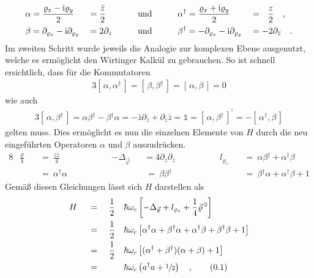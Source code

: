 \documentclass[a4paper,11pt]{article}
\newcommand{\ind}[2]{{_{#1}^{#2}}}
\newcommand{\+}{\dagger}
\newcommand{\com}[2]{[\, #1, #2 \,]}
\newcommand\numberthis{\stepcounter{equation} \tag{\thesection.\theequation}}
\renewcommand{\v}{\vec}
\renewcommand{\^}{\hat}
\renewcommand{\tt}{\text}
\renewcommand{\~}{\widetilde}
\begin{document}
\begin{alignat*}{5}
& \alpha = \frac{\varrho_x-\tt i \varrho_y}{2}&&=\frac{\bar z}{2} && \qquad \tt{und} \qquad && \alpha\ind{}{\+} = \frac{\varrho_x+\tt i \varrho_y}{2}&&=\ \ \frac{ z}{2} \quad, \\
& \beta = \partial_{\varrho_x}-\tt i \partial_{\varrho_y}&&=2\partial_z && \qquad \tt{und} \qquad && \beta\ind{}{\+} = -\partial_{\varrho_x}-\tt i \partial_{\varrho_y}&&=-2\partial_{\bar z} \quad.
\end{alignat*}
Im zweiten Schritt wurde jeweils die Analogie zur komplexen Ebene ausgenutzt, welche es ermöglicht den Wirtinger Kalkül zu gebrauchen. So ist schnell ersichtlich, dass für die Kommutatoren 
\begin{alignat*}{3}
 \com{\alpha}{\alpha\ind{}{\+}} = \com{\beta}{\beta\ind{}{\+}} = \com{\alpha}{\beta} = 0
\end{alignat*}
wie auch 
\begin{alignat*}{3}
\com{\alpha}{\beta\ind{}{\+}} = \alpha\beta\ind{}{\+} - \beta\ind{}{\+}\alpha= -\bar z\partial_{\bar z} + \partial_{\bar z} \bar z  =  \mathds{1} 
= \com{\alpha}{\beta\ind{}{\+}}^{^{\scriptstyle \+}} = - \com{\alpha\ind{}{\+}}{\beta}
\end{alignat*}
gelten muss. Dies ermöglicht es nun die einzelnen Elemente von $H$ durch die neu eingeführten Operatoren $\alpha$ und $\beta$ auszudrücken. 
\begin{alignat*}{8}
& \frac{\varrho}{4}&&\ =\  \frac{z\bar z }{4}  &&\qquad && -\Delta_{\v \varphi}&&= 4\partial_z\partial_{\bar z}
&& \qquad && l_{\varrho_z}  &&\ =\  \alpha\beta\ind{}{\+} + \alpha\ind{}{\+}\beta  \\
& &&\ =\  \alpha\ind{}{\+}\alpha && && &&\ =\ \beta\beta\ind{}{\+}  && && && \ =\ \beta\ind{}{\+}\alpha + \alpha\ind{}{\+}\beta +1 
\end{alignat*}
Gemäß diesen Gleichungen lässt sich $H$ darstellen als 
\begin{alignat*}{4}
& H &&\ = \ && \frac{1}{2}&&\hbar\omega _c \left [-\Delta_{\v \varrho} + l_{\varrho_z} +\frac{1}{4}\v \varrho\, ^2\right ] \\
& &&\ = \ &&\frac{1}{2}&&\hbar\omega_c \left [\alpha\ind{}{\+}\alpha + \beta\ind{}{\+}\alpha + \alpha\ind{}{\+}\beta +\beta\ind{}{\+}\beta+1\right ] \\
& &&\ = \ && \frac{1}{2}&&\hbar\omega_c \left [(\alpha\ind{}{\+}+\beta\ind{}{\+})(\alpha+\beta)+1\right ] \\
& &&\ = \ && &&\hbar\omega_c \left (a\ind{}{\+}a+\sfrac{1}{2}\right )\quad , \numberthis \label{Landau Hamiltonian Elektron}
\end{alignat*}
\end{document}
